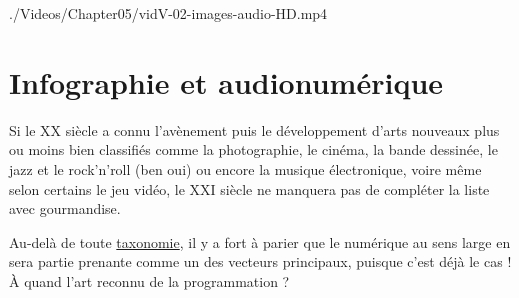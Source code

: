 \begin{marginvideo}%
		{./Videos/Chapter05/vidV-02-images-audio-HD.mp4}%
\end{marginvideo}

\section[Infographie et audionumérique]{Infographie et audionumérique}
\label{sec:V.2}

Si le XX siècle a connu l'avènement puis le développement d'arts nouveaux plus ou moins bien classifiés comme la photographie, le cinéma, la bande dessinée, le jazz et le rock'n'roll (ben oui) ou encore la musique électronique, voire même selon certains le jeu vidéo, le XXI siècle ne manquera pas de compléter la liste avec gourmandise. 

Au-delà de toute \href{https://fr.wikipedia.org/wiki/Classification_des_arts}{taxonomie}, il y a fort à parier que le numérique au sens large en sera partie prenante comme un des vecteurs principaux, puisque c'est déjà le cas ! À quand l'art reconnu de la programmation ?

